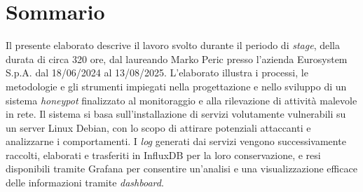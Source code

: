 \cleardoublepage
{}
{}
\begingroup
\let\clearpage\relax
\let\cleardoublepage\relax
\chapter*{Sommario}
Il presente elaborato descrive il lavoro svolto durante il periodo di \textit{stage}, della durata di circa
320 ore, dal laureando Marko Peric presso l'azienda Eurosystem S.p.A. dal 18/06/2024 al
13/08/2025.
L'elaborato illustra i processi, le metodologie e gli strumenti impiegati nella progettazione e nello sviluppo di un sistema \textit{honeypot} finalizzato al monitoraggio e alla rilevazione di attività malevole in rete. Il sistema si basa sull'installazione di servizi volutamente vulnerabili su un server Linux Debian, con lo scopo di attirare potenziali attaccanti e analizzarne i comportamenti. I \textit{log} generati dai servizi vengono successivamente raccolti, elaborati e trasferiti in InfluxDB per la loro conservazione, e resi disponibili tramite Grafana per consentire un'analisi e una visualizzazione efficace delle informazioni tramite \textit{dashboard}.
